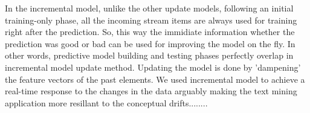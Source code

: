 \begin{center} In the incremental model, unlike the other update models, following an initial training-only phase, all the incoming stream items are always used for training right after the prediction. So, this way the immidiate information whether the prediction was good or bad can be used for improving the model on the fly. In other words, predictive model building and testing phases perfectly overlap in incremental model update method. Updating the model is done by 'dampening' the feature vectors of the past elements. We used incremental model to achieve a real-time response to the changes in the data arguably making the text mining application more resillant to the conceptual drifts........ \end{center}
